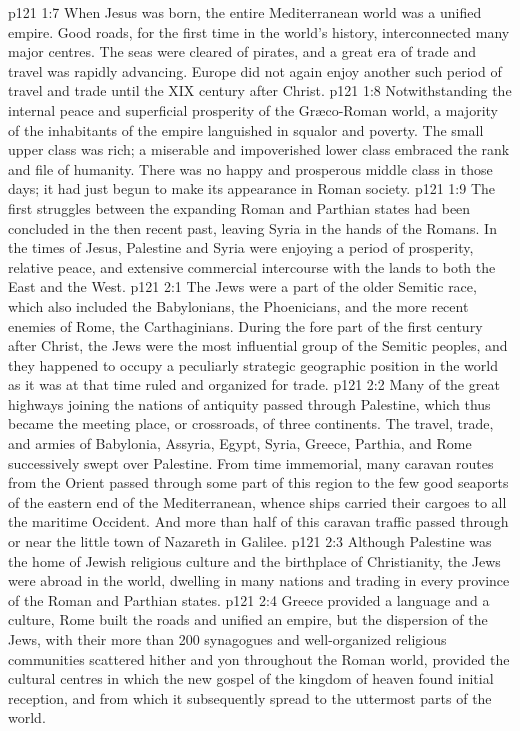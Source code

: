 \vs p121 1:7 \pc When Jesus was born, the entire Mediterranean world was a unified empire. Good roads, for the first time in the world’s history, interconnected many major centres. The seas were cleared of pirates, and a great era of trade and travel was rapidly advancing. Europe did not again enjoy another such period of travel and trade until the XIX century after Christ.
\vs p121 1:8 Notwithstanding the internal peace and superficial prosperity of the Gr\ae co\hyp{}Roman world, a majority of the inhabitants of the empire languished in squalor and poverty. The small upper class was rich; a miserable and impoverished lower class embraced the rank and file of humanity. There was no happy and prosperous middle class in those days; it had just begun to make its appearance in Roman society.
\vs p121 1:9 The first struggles between the expanding Roman and Parthian states had been concluded in the then recent past, leaving Syria in the hands of the Romans. In the times of Jesus, Palestine and Syria were enjoying a period of prosperity, relative peace, and extensive commercial intercourse with the lands to both the East and the West.
\vs p121 2:1 The Jews were a part of the older Semitic race, which also included the Babylonians, the Phoenicians, and the more recent enemies of Rome, the Carthaginians. During the fore part of the first century after Christ, the Jews were the most influential group of the Semitic peoples, and they happened to occupy a peculiarly strategic geographic position in the world as it was at that time ruled and organized for trade.
\vs p121 2:2 Many of the great highways joining the nations of antiquity passed through Palestine, which thus became the meeting place, or crossroads, of three continents. The travel, trade, and armies of Babylonia, Assyria, Egypt, Syria, Greece, Parthia, and Rome successively swept over Palestine. From time immemorial, many caravan routes from the Orient passed through some part of this region to the few good seaports of the eastern end of the Mediterranean, whence ships carried their cargoes to all the maritime Occident. And more than half of this caravan traffic passed through or near the little town of Nazareth in Galilee.
\vs p121 2:3 Although Palestine was the home of Jewish religious culture and the birthplace of Christianity, the Jews were abroad in the world, dwelling in many nations and trading in every province of the Roman and Parthian states.
\vs p121 2:4 Greece provided a language and a culture, Rome built the roads and unified an empire, but the dispersion of the Jews, with their more than 200 synagogues and well\hyp{}organized religious communities scattered hither and yon throughout the Roman world, provided the cultural centres in which the new gospel of the kingdom of heaven found initial reception, and from which it subsequently spread to the uttermost parts of the world.
